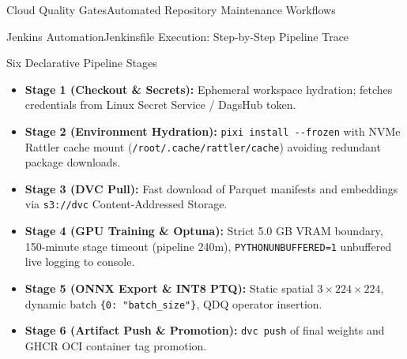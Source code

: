 \begin{frame}{Cloud Quality Gates}{Automated Repository Maintenance Workflows}
\end{frame}

\begin{frame}{Jenkins Automation}{Jenkinsfile Execution: Step-by-Step Pipeline Trace}
    \begin{block}{Six Declarative Pipeline Stages}
        \begin{itemize}\scriptsize
            \item \textbf{Stage 1 (Checkout \& Secrets):} Ephemeral workspace hydration; fetches credentials from Linux Secret Service / DagsHub token.
            \item \textbf{Stage 2 (Environment Hydration):} \texttt{pixi install {-}{-}frozen} with NVMe Rattler cache mount (\texttt{/root/.cache/rattler/cache}) avoiding redundant package downloads.
            \item \textbf{Stage 3 (DVC Pull):} Fast download of Parquet manifests and embeddings via \texttt{s3://dvc} Content-Addressed Storage.
            \item \textbf{Stage 4 (GPU Training \& Optuna):} Strict 5.0 GB VRAM boundary, 150-minute stage timeout (pipeline 240m), \texttt{PYTHONUNBUFFERED=1} unbuffered live logging to console.
            \item \textbf{Stage 5 (ONNX Export \& INT8 PTQ):} Static spatial $3 \times 224 \times 224$, dynamic batch \texttt{\{0: "batch\_size"\}}, QDQ operator insertion.
            \item \textbf{Stage 6 (Artifact Push \& Promotion):} \texttt{dvc push} of final weights and GHCR OCI container tag promotion.
        \end{itemize}
    \end{block}



\end{frame}
